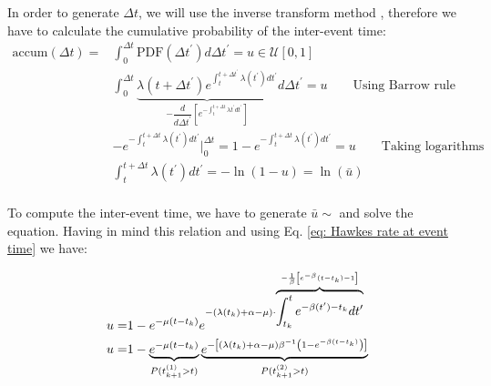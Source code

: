 In order to generate $\Delta t$, we will use the inverse transform method \cite{Toral}, therefore we have to calculate the cumulative probability of the inter-event time:
\begin{equation}
    \begin{split}
        \text{accum}(\Delta t)=&\int_{0}^{\Delta t}\text{PDF}\left( \Delta t^\prime \right)d\Delta t^\prime = u\in\mathcal{U}  [0,1]\\
        &\int_{0}^{\Delta t} \underbrace{\lambda(t+\Delta t^\prime)e^{\int_{t}^{t+\Delta t^\prime}\lambda(t^{\prime})dt^{\prime}}}_{-\dfrac{d}{d\Delta t^{\prime}}\left[ e^{-\int_{t}^{t+\Delta t}\lambda t^\prime dt^\prime} \right]}d\Delta t^\prime=u \qquad  \text{Using Barrow rule}\\
        &-e^{-\int_{t}^{t+\Delta t}\lambda(t^\prime)dt^\prime}\Big|_{0}^{\Delta t}=1-e^{-\int_{t}^{t+\Delta t}\lambda(t^\prime)dt^\prime}=u\qquad  \text{Taking logarithms}\\
        &\int_{t}^{t+\Delta t}\lambda(t^\prime)dt^\prime=-\ln(1-u) = \ln (\bar{u})\\
    \end{split}
    \label{eq: cumulative probability}
\end{equation}

To compute the inter-event time, we have to generate $\bar{u}\sim$ and solve the equation. Having in mind this relation and using Eq. \ref{eq: Hawkes rate at event time} we have:

\begin{equation}
    \begin{split}
        u=&1-e^{-\mu(t-t_k)}e^{-(\lambda(t_k)+\alpha-\mu)\cdot\overbrace{\int_{t_k}^{t}e^{-\beta(t^\prime)-t_k}dt^\prime}^{-\frac{1}{\beta}\left[ e^{-\beta}(t-t_k)-1 \right]}}\\
        u=&1-\underbrace{e^{-\mu(t-t_k)}}_{P(t_{k+1}^{(1)}>t)}\underbrace{e^{-\left[ (\lambda(t_k)+\alpha-\mu)\beta^{-1}\left( 1-e^{-\beta(t-t_k)} \right) \right]}}_{{P(t_{k+1}^{(2)}>t)}}
    \end{split}
    \label{eq: u = 1 - P(t_{k+1} > t)P(t_{k+1} > t), previo al composition method}
\end{equation}

